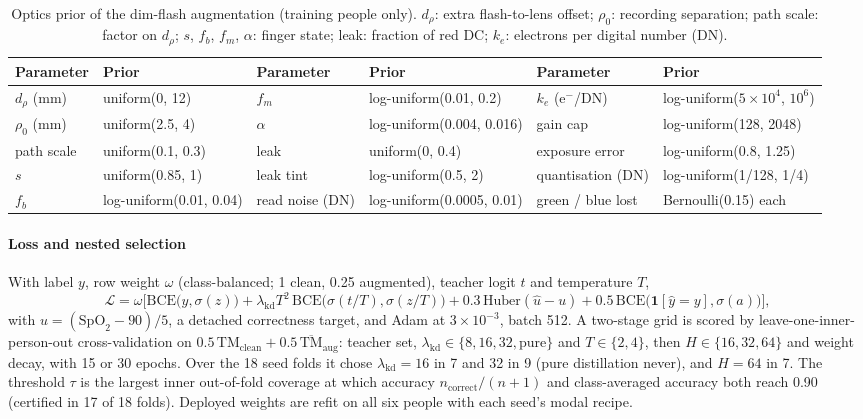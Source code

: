 \documentclass[11pt,letterpaper]{article}
\newcommand{\spo}{\ensuremath{\mathrm{SpO}_2}}
\begin{document}
\begin{table}[tbp]
\centering
\caption{Optics prior of the dim-flash augmentation (training people only). $d_\rho$: extra flash-to-lens offset; $\rho_0$: recording separation; path scale: factor on $d_\rho$; $s$, $f_b$, $f_m$, $\alpha$: finger state; leak: fraction of red DC; $k_e$: electrons per digital number (DN).}\label{tab:prior}
{\footnotesize\setlength{\tabcolsep}{4pt}
\begin{adjustbox}{max width=\linewidth}
\begin{tabular}{@{}llllll@{}}
\toprule
Parameter & Prior & Parameter & Prior & Parameter & Prior \\
\midrule
$d_\rho$ (mm) & uniform(0, 12) & $f_m$ & log-uniform(0.01, 0.2) & $k_e$ (e$^-$/DN) & log-uniform($5\times10^4$, $10^6$) \\
$\rho_0$ (mm) & uniform(2.5, 4) & $\alpha$ & log-uniform(0.004, 0.016) & gain cap & log-uniform(128, 2048) \\
path scale & uniform(0.1, 0.3) & leak & uniform(0, 0.4) & exposure error & log-uniform(0.8, 1.25) \\
$s$ & uniform(0.85, 1) & leak tint & log-uniform(0.5, 2) & quantisation (DN) & log-uniform(1/128, 1/4) \\
$f_b$ & log-uniform(0.01, 0.04) & read noise (DN) & log-uniform(0.0005, 0.01) & green / blue lost & Bernoulli(0.15) each \\
\bottomrule
\end{tabular}
\end{adjustbox}}
\end{table}

\paragraph{Loss and nested selection} With label $y$, row weight $\omega$ (class-balanced; 1 clean, 0.25 augmented), teacher logit $t$ and temperature $T$,
\begin{equation}
\mathcal L=\omega\Big[\mathrm{BCE}\big(y,\sigma(z)\big)+\lambda_{\mathrm{kd}}T^2\,\mathrm{BCE}\big(\sigma(t/T),\sigma(z/T)\big)+0.3\,\mathrm{Huber}(\hat u-u)+0.5\,\mathrm{BCE}\big(\mathbf{1}[\hat y=y],\sigma(a)\big)\Big],
\end{equation}
with $u=(\spo-90)/5$, a detached correctness target, and Adam at $3\times10^{-3}$, batch 512. A two-stage grid is scored by leave-one-inner-person-out cross-validation on $0.5\,\mathrm{TM}_{\mathrm{clean}}+0.5\,\overline{\mathrm{TM}}_{\mathrm{aug}}$: teacher set, $\lambda_{\mathrm{kd}}\in\{8,16,32,\text{pure}\}$ and $T\in\{2,4\}$, then $H\in\{16,32,64\}$ and weight decay, with 15 or 30 epochs. Over the 18 seed folds it chose $\lambda_{\mathrm{kd}}=16$ in 7 and 32 in 9 (pure distillation never), and $H=64$ in 7. The threshold $\tau$ is the largest inner out-of-fold coverage at which accuracy $n_{\mathrm{correct}}/(n+1)$ and class-averaged accuracy both reach 0.90 (certified in 17 of 18 folds). Deployed weights are refit on all six people with each seed's modal recipe.
\end{document}
